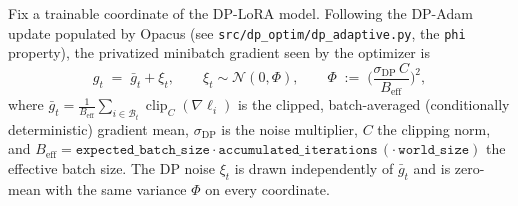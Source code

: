 \begin{definition}\label{def:phi}
Fix a trainable coordinate of the DP-LoRA model. Following the DP-Adam update populated by Opacus (see \texttt{src/dp\_optim/dp\_adaptive.py}, the \texttt{phi} property), the privatized minibatch gradient seen by the optimizer is
\[
g_t \;=\; \bar g_t + \xi_t,\qquad \xi_t \sim \mathcal N(0,\Phi),\qquad
\Phi \;:=\; \Big(\frac{\sigma_{\mathrm{DP}}\,C}{B_{\mathrm{eff}}}\Big)^2,
\]
where $\bar g_t=\tfrac1{B_{\mathrm{eff}}}\sum_{i\in\mathcal B_t}\operatorname{clip}_C(\nabla\ell_i)$ is the clipped, batch-averaged (conditionally deterministic) gradient mean, $\sigma_{\mathrm{DP}}$ is the noise multiplier, $C$ the clipping norm, and $B_{\mathrm{eff}}=\texttt{expected\_batch\_size}\cdot\texttt{accumulated\_iterations}\,(\cdot\,\texttt{world\_size})$ the effective batch size. The DP noise $\xi_t$ is drawn independently of $\bar g_t$ and is zero-mean with the same variance $\Phi$ on every coordinate.
\end{definition}

